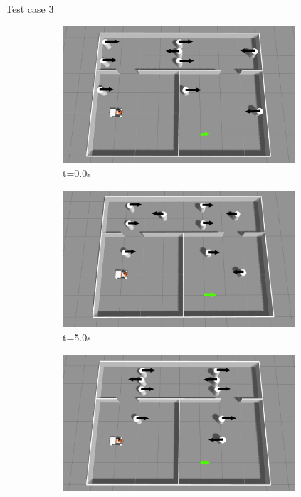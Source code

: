 \documentclass{beamer}
\begin{document}
\begin{frame}[t]{\huge{Test case 3}}
\begin{figure}[H]
    \centering
    \begin{subfigure}[b]{0.35\linewidth}
        \centering
        \includegraphics[width=0.95\textwidth]{../report/images/test_case_3/exp1.png}
        \caption{t=0.0s}
    \end{subfigure}%
    \begin{subfigure}[b]{0.35\linewidth}
        \centering
        \includegraphics[width=0.95\textwidth]{../report/images/test_case_3/mid1.png}
        \caption{t=5.0s}
    \end{subfigure}%
    \begin{subfigure}[b]{0.35\linewidth}
        \centering
        \includegraphics[width=0.95\textwidth]{../report/images/test_case_3/exp2.png}

\end{subfigure}
\end{figure}
\end{frame}
\end{document}
